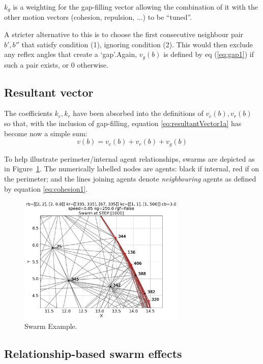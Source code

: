\documentclass[12pt,a4paper]{IEEEtran}
\newcommand{\kc}{\mathit{k_{c}}}
\newcommand{\kr}{\mathit{k_{r}}}
\newcommand{\kg}{\mathit{k_{g}}}
\begin{document}
$\kg$ is a weighting for the gap-filling vector allowing the combination of it with the other motion vectors (cohesion, repulsion, ...) to be ``tuned''.

A stricter alternative to this is to choose the first consecutive neighbour pair $b',b''$ that satisfy condition (1), ignoring condition (2).  This would then exclude any reflex angles that create a `gap'.Again, $v_g(b)$ is defined by eq (\ref{eq:gap1}) if such a pair exists, or 0 otherwise.

\subsection{Resultant vector}
The coefficients $\kc, \kr$ have been absorbed into the definitions of $v_c(b), v_r(b)$ so that, with the inclusion of gap-filling, equation \ref{eq:resultantVector1a} has become now a simple sum:
\begin{equation}\label{eq:res}
	v(b) = v_c(b) + v_r(b) + v_g(b) 
\end{equation}

To help illustrate perimeter/internal agent relationships, swarms are depicted as in Figure~\ref{fig:swarmExample}. The numerically labelled nodes are agents: black if internal, red if on the perimeter; and the lines joining agents denote \emph{neighbouring} agents as defined by equation \ref{eq:cohesion1}.

\begin{figure}[H]
	\begin{center}
		\includegraphics[width=8cm]{figures/perimeterCompress}
	\end{center}
	\caption{Swarm Example.\label{fig:swarmExample}}
\end{figure}

\subsection{Relationship-based swarm effects}
\end{document}
